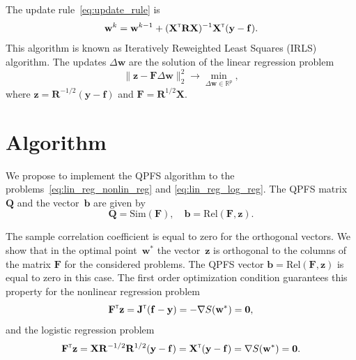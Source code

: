 \documentclass[a4paper,12pt]{article}
\theoremstyle{plain} %
\theoremstyle{definition} %
\theoremstyle{remark} %
\newcommand{\bb}{\mathbf{b}}
\newcommand{\bw}{\mathbf{w}}
\newcommand{\by}{\mathbf{y}}
\newcommand{\bz}{\mathbf{z}}
\newcommand{\bJ}{\mathbf{J}}
\newcommand{\bQ}{\mathbf{Q}}
\newcommand{\bbR}{\mathbb{R}}
\newcommand{\bF}{\mathbf{F}}
\newcommand{\bR}{\mathbf{R}}
\newcommand{\bX}{\mathbf{X}}
\newcommand{\T}{{\text{\tiny\sffamily\upshape\mdseries T}}}
\begin{document}
	The update rule~\eqref{eq:update_rule} is
	\[
		\bw^k = \bw^{k - 1} + (\bX^{\T} \bR \bX)^{-1} \bX^{\T} (\by - \mathbf{f}).
	\]
	This algorithm is known as Iteratively Reweighted Least Squares (IRLS) algorithm. The updates $\Delta \bw$ are the solution of the linear regression problem
	\begin{equation}
		\| \bz - \bF \Delta \bw \|_2^2 \rightarrow \min_{\Delta \bw \in \bbR^{p}},
		\label{eq:lin_reg_log_reg}
	\end{equation}
	where $\bz = \bR^{-1/2} (\by - \mathbf{f})$ and $\bF = \bR^{1/2}\bX$.

	\section*{Algorithm}
	We propose to implement the QPFS algorithm to the problems~\eqref{eq:lin_reg_nonlin_reg} and \eqref{eq:lin_reg_log_reg}. 
	The QPFS matrix~$\bQ$ and the vector~$\bb$ are given by
	\[
		\bQ = \text{Sim} (\bF), \quad \bb = \text{Rel} (\bF, \bz).
	\]
	
	The sample correlation coefficient is equal to zero for the orthogonal vectors.
	We show that in the optimal point~$\bw^*$ the vector~$\bz$ is orthogonal to the columns of the matrix $\bF$ for the considered problems. 
	The QPFS vector $\bb = \text{Rel} (\bF, \bz)$ is equal to zero in this case.
	The first order optimization condition guarantees this property for the nonlinear regression problem
	\[
	\bF^{\T} \bz = \bJ^{\T} (\mathbf{f} - \by) = - \nabla S(\bw^*) = \boldsymbol{0},
	\]
	and the logistic regression problem
	\[
	\bF^{\T} \bz = \bX \bR^{-1/2} \bR^{1/2} (\by - \mathbf{f}) = \bX^{\T} (\by - \mathbf{f}) = \nabla S(\bw^*) = \boldsymbol{0}.
	\]
	
\end{document}

